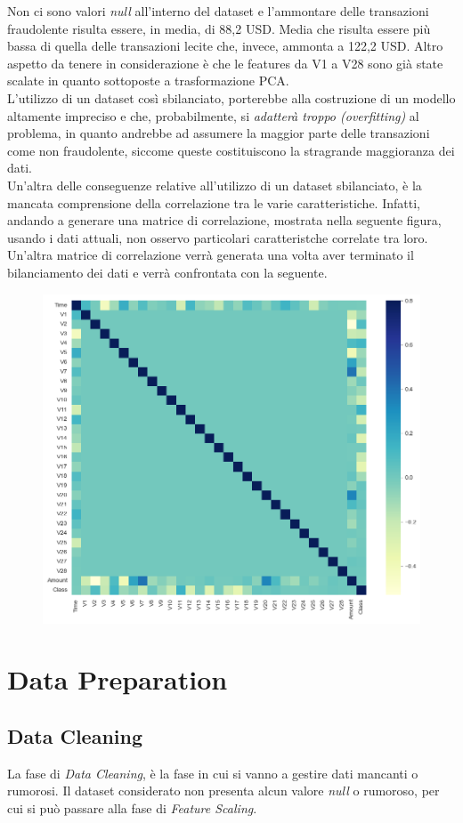 \documentclass[]{article}
\begin{document}
        Non ci sono valori \textit{null} all'interno del dataset e l'ammontare delle transazioni fraudolente risulta essere, in media, di 88,2 USD. Media che risulta essere più bassa di quella delle transazioni lecite che, invece, ammonta a 122,2 USD. Altro aspetto da tenere in considerazione è che le features da V1 a V28 sono già state scalate in quanto sottoposte a trasformazione PCA.\\
        L'utilizzo di un dataset così sbilanciato, porterebbe alla costruzione di un modello altamente impreciso e che, probabilmente, si \textit{adatterà troppo (overfitting)} al problema, in quanto andrebbe ad assumere la maggior parte delle transazioni come non fraudolente, siccome queste costituiscono la stragrande maggioranza dei dati.\\
        Un'altra delle conseguenze relative all'utilizzo di un dataset sbilanciato, è la mancata comprensione della correlazione tra le varie caratteristiche. Infatti, andando a generare una matrice di correlazione, mostrata nella seguente figura, usando i dati attuali, non osservo particolari caratteristche correlate tra loro. Un'altra matrice di correlazione verrà generata una volta aver terminato il bilanciamento dei dati e verrà confrontata con la seguente.
        \begin{figure}[H]
            \centering
            \includegraphics[width=.6\textwidth]{img/correlationMatrixUnbalanced.png}
            \caption[short]{}
        \end{figure}

\section{Data Preparation}
    \subsection{Data Cleaning}
        La fase di \textit{Data Cleaning}, è la fase in cui si vanno a gestire dati mancanti o rumorosi.
        Il dataset considerato non presenta alcun valore \textit{null} o rumoroso, per cui si può passare alla fase di \textit{Feature Scaling}.
\end{document}
